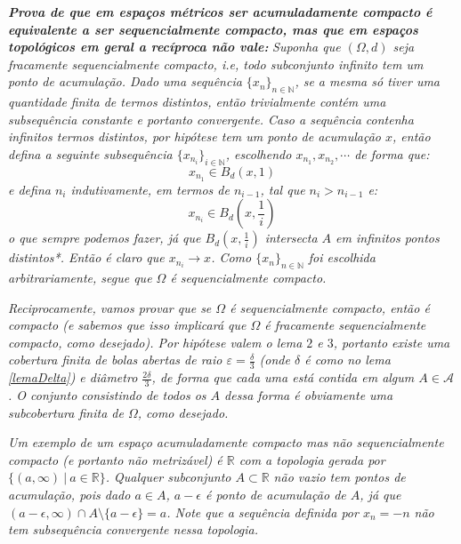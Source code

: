 \begin{dem}
    \textit{\textbf{Prova de que em espaços métricos ser acumuladamente compacto é equivalente a ser sequencialmente compacto, mas que em espaços topológicos em geral a recíproca não vale: }}\textit{Suponha que $(\Omega, d)$ seja fracamente sequencialmente compacto, i.e, todo subconjunto infinito tem um ponto de acumulação. Dado uma sequência $\{x_n \}_{n \in \mathbb{N}}$, se a mesma só tiver uma quantidade finita de termos distintos, então trivialmente contém uma subsequência constante e portanto convergente. Caso a sequência contenha infinitos termos distintos, por hipótese tem um ponto de acumulação $x$, então defina a seguinte subsequência $\{x_{n_i} \}_{i \in \mathbb{N}}$, escolhendo $x_{n_1}, x_{n_2}, \cdots$ de forma que:}
    $$x_{n_1} \in B_d(x, 1)$$ 
    \textit{e defina $n_i$ indutivamente, em termos de $n_{i-1}$, tal que $n_i > n_{i-1}$ e:}
    $$x_{n_{i}} \in B_d\left(x, \frac{1}{i}\right)$$
    \textit{o que sempre podemos fazer, já que $B_d\left(x, \frac{1}{i}\right)$ intersecta $A$ em infinitos pontos distintos*. Então é claro que $x_{n_i} \rightarrow x$. Como $\{x_n \}_{n \in \mathbb{N}}$ foi escolhida arbitrariamente, segue que $\Omega$ é sequencialmente compacto.} \par
    \textit{Reciprocamente, vamos provar que se $\Omega$ é sequencialmente compacto, então é compacto (e sabemos que isso implicará que $\Omega$ é fracamente sequencialmente compacto, como desejado). Por hipótese valem o lema $2$ e $3$, portanto existe uma cobertura finita de bolas abertas de raio $\varepsilon = \frac{\delta}{3}$ (onde $\delta$ é como no lema \cref{lemaDelta}) e diâmetro $\frac{2\delta}{3}$, de forma que cada uma está contida em algum $A \in \mathscr{A}$. O conjunto consistindo de todos os $A$ dessa forma é obviamente uma subcobertura finita de $\Omega$, como desejado.}\par
    \textit{Um exemplo de um espaço acumuladamente compacto mas não sequencialmente compacto (e portanto não metrizável) é $\mathbb{R}$ com a topologia gerada por $\{(a, \infty) \ \vert \ a \in \mathbb{R} \}$. Qualquer subconjunto $A \subset \mathbb{R}$ não vazio tem pontos de acumulação, pois dado $a \in A$, $a - \epsilon$ é ponto de acumulação de $A$, já que $(a- \epsilon, \infty) \cap A \setminus \{a - \epsilon \} = a$. Note que a sequência  definida por $x_n = -n$ não tem subsequência convergente nessa topologia.}
\end{dem}

